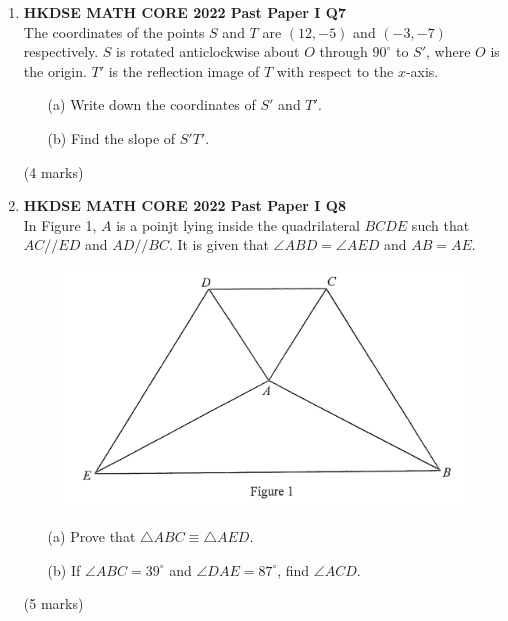 \documentclass[12pt]{article}
\begin{document}
\begin{enumerate}
	\item \textbf{HKDSE MATH CORE 2022 Past Paper I Q7}\\
	The coordinates of the points $S$ and $T$ are $(12, -5)$ and $(-3, -7)$ respectively. $S$ is rotated anticlockwise about $O$ through $90^\circ$ to $S'$, where $O$ is the origin. $T'$ is the reflection image of $T$ with respect to the $x$-axis.
	\begin{enumerate}
		\item[(a)] Write down the coordinates of $S'$ and $T'$.
		\item[(b)] Find the slope of $S'T'$.
	\end{enumerate}
	(4 marks)
	
	\item \textbf{HKDSE MATH CORE 2022 Past Paper I Q8}\\
	In Figure 1, $A$ is a poinjt lying inside the quadrilateral $BCDE$ such that $AC // ED$ and $AD // BC$. It is given that $\angle ABD = \angle AED$ and $AB = AE$.
	\begin{figure}[H]
		\centering
		\includegraphics[width = .3\linewidth]{2022Figure1.1}
	\end{figure}
	\begin{enumerate}
		\item[(a)] Prove that $\triangle ABC \equiv \triangle AED$.
		\item[(b)] If $\angle ABC = 39^\circ$ and $\angle DAE = 87^\circ$, find $\angle ACD$.
	\end{enumerate}
	(5 marks)	
	

\end{enumerate}
\end{document}
